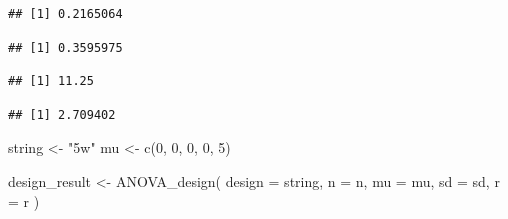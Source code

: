 \documentclass[
]{book}
\newenvironment{Shaded}{\begin{snugshade}}{\end{snugshade}}
\newcommand{\AttributeTok}[1]{\textcolor[rgb]{0.77,0.63,0.00}{#1}}
\newcommand{\DecValTok}[1]{\textcolor[rgb]{0.00,0.00,0.81}{#1}}
\newcommand{\FunctionTok}[1]{\textcolor[rgb]{0.00,0.00,0.00}{#1}}
\newcommand{\NormalTok}[1]{#1}
\newcommand{\OtherTok}[1]{\textcolor[rgb]{0.56,0.35,0.01}{#1}}
\newcommand{\SpecialCharTok}[1]{\textcolor[rgb]{0.00,0.00,0.00}{#1}}
\newcommand{\StringTok}[1]{\textcolor[rgb]{0.31,0.60,0.02}{#1}}
\begin{document}
\begin{verbatim}
## [1] 0.2165064
\end{verbatim}

\begin{Shaded}
\end{Shaded}

\begin{verbatim}
## [1] 0.3595975
\end{verbatim}

\begin{Shaded}
\end{Shaded}

\begin{verbatim}
## [1] 11.25
\end{verbatim}

\begin{Shaded}
\end{Shaded}

\begin{verbatim}
## [1] 2.709402
\end{verbatim}

\begin{Shaded}
\begin{Highlighting}[]
\NormalTok{string }\OtherTok{\textless{}{-}} \StringTok{"5w"}
\NormalTok{mu }\OtherTok{\textless{}{-}} \FunctionTok{c}\NormalTok{(}\DecValTok{0}\NormalTok{, }\DecValTok{0}\NormalTok{, }\DecValTok{0}\NormalTok{, }\DecValTok{0}\NormalTok{, }\DecValTok{5}\NormalTok{) }

\NormalTok{design\_result }\OtherTok{\textless{}{-}} \FunctionTok{ANOVA\_design}\NormalTok{(}
  \AttributeTok{design =}\NormalTok{ string,}
  \AttributeTok{n =}\NormalTok{ n,}
  \AttributeTok{mu =}\NormalTok{ mu,}
  \AttributeTok{sd =}\NormalTok{ sd,}
  \AttributeTok{r =}\NormalTok{ r}
\NormalTok{)}
\end{Highlighting}
\end{Shaded}
\end{document}
